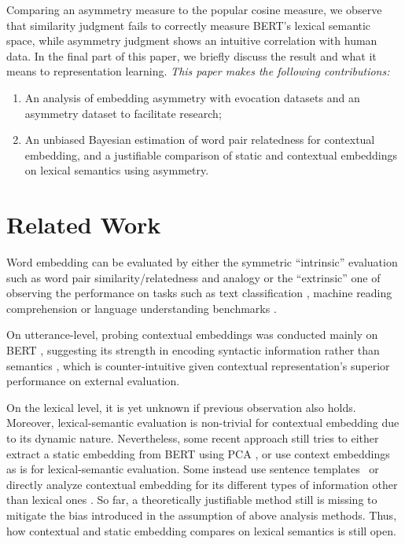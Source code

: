 \documentclass[letterpaper]{article} %
\begin{document}
Comparing an asymmetry measure to the popular cosine measure, we observe that similarity judgment fails to correctly measure BERT's lexical semantic space, while asymmetry judgment shows an intuitive correlation with human data. In the final part of this paper, we briefly discuss the result and what it means to representation learning. \textit{This paper makes the following contributions:}
\begin{enumerate}
    \item An analysis of embedding asymmetry with evocation datasets and an asymmetry dataset to facilitate research;
    \item An unbiased Bayesian estimation of word pair relatedness for contextual embedding, and a justifiable comparison of static and contextual embeddings on lexical semantics using asymmetry.
\end{enumerate}

\section{Related Work}

Word embedding can be evaluated by either the  symmetric ``intrinsic'' evaluation such as word pair similarity/relatedness \cite{agirre-etal-2009-study,hill2015simlex} and analogy \cite{mikolov2013distributed} or the ``extrinsic'' one of observing the performance on tasks such as text classification \cite{joulin2016fasttext}, machine reading comprehension \cite{rajpurkar-etal-2016-squad} or language understanding benchmarks \cite{wang2018glue,wang2019superglue}.

On utterance-level, probing contextual embeddings was conducted mainly on BERT \cite{devlin2018bert}, suggesting its strength in encoding syntactic information rather than semantics \cite{hewitt2019structural,reif2019visualizing,tenney2019you,tenney2019bert,mickus2019mean}, which is counter-intuitive given contextual representation's superior performance on external evaluation.

On the lexical level, it is yet unknown if previous observation also holds. Moreover, lexical-semantic evaluation is non-trivial for contextual embedding due to its dynamic nature. Nevertheless, some recent approach still tries to either extract a static embedding from BERT using PCA \cite{Ethayarajh2019HowCA,coenen2019visualizing}, or use context embeddings as is \cite{mickus2019mean} for lexical-semantic evaluation. Some instead use sentence templates~\citep{petroni2019language,bouraoui2019inducing} or directly analyze contextual embedding for its different types of information other than lexical ones \cite{brunner2019validity,clark2019what,coenen2019visualizing,jawahar2019does}. So far, a theoretically justifiable method still is missing to mitigate the bias introduced in the assumption of above analysis methods. Thus, how contextual and static embedding compares on lexical semantics is still open.
\end{document}
